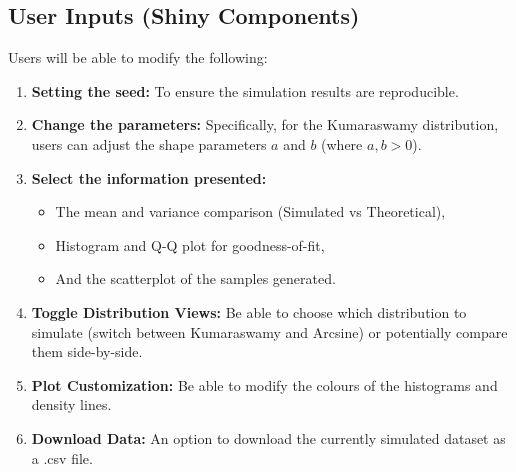 \documentclass{article}
\begin{document}
\begin{normalsize}
\section{User Inputs (Shiny Components)}
Users will be able to modify the following:
\begin{enumerate}
    \item \textbf{Setting the seed:} To ensure the simulation results are reproducible.
    \item \textbf{Change the parameters:} Specifically, for the Kumaraswamy distribution, users can adjust the shape parameters $a$ and $b$ (where $a, b > 0$).
    \item \textbf{Select the information presented:}
    \begin{itemize}
        \item The mean and variance comparison (Simulated vs Theoretical),
        \item Histogram and Q-Q plot for goodness-of-fit,
        \item And the scatterplot of the samples generated.
    \end{itemize}
    \item \textbf{Toggle Distribution Views:} Be able to choose which distribution to simulate (switch between Kumaraswamy and Arcsine) or potentially compare them side-by-side.
    \item \textbf{Plot Customization:} Be able to modify the colours of the histograms and density lines.
    \item \textbf{Download Data:} An option to download the currently simulated dataset as a .csv file.
\end{enumerate}

\end{normalsize}


 

\nocite{RCoreTeam}
\nocite{shiny}
\nocite{voss2013intro}
\nocite{white2015template}
\end{document}
